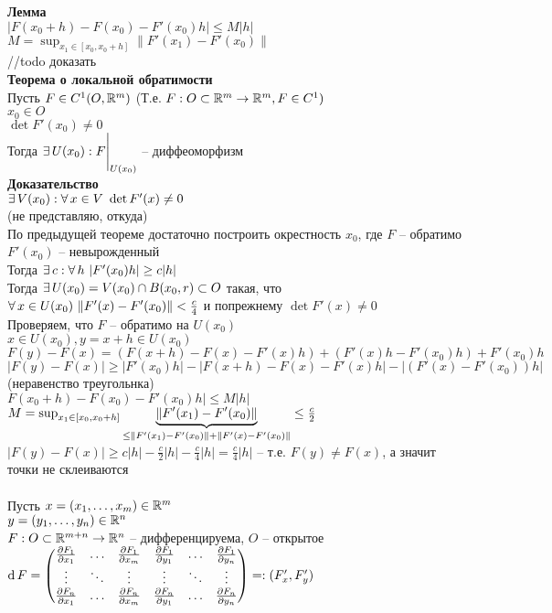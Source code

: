 \documentclass[12pt]{article}
\newcommand{\ppart}[2]{\frac{\partial #1}{\partial #2}}
\begin{document}
\textbf{Лемма}\\
$|F(x_0+h)-F(x_0) - F'(x_0)h| \leq M|h|$\\
$M=\sup_{x_1\in [x_0, x_0+h]} \|F'(x_1)-F'(x_0)\|$\\
//todo доказать\\
\textbf{Теорема о локальной обратимости}\\
Пусть $F \in C^1(O, \Rset^m)$ (Т.е. $F: O\subset \Rset^m \rto \Rset^m, F \in C^1)$\\
$x_0 \in O$\\
$\det F'(x_0) \neq 0$\\
Тогда $\ex U(x_0): F\vl_{U(x_0)}$ -- диффеоморфизм\\
\textbf{Доказательство}\\
$\ex V(x_0): \fall x \in V\ \det F'(x) \neq 0$\\
(не представляю, откуда)\\
По предыдущей теореме достаточно построить окрестность $x_0$, где $F$ -- обратимо\\
$F'(x_0)$ -- невырожденный\\
Тогда $\ex c: \fall h\ |F'(x_0)h| \geq c|h|$\\
Тогда $\ex U(x_0) = V(x_0) \cap B(x_0, r) \subset O$ такая, что $\fall x \in U(x_0)\ \|F'(x)-F'(x_0)\| < \frac c4$ и попрежнему $\det F'(x) \neq 0$\\
Проверяем, что $F$ -- обратимо на $U(x_0)$\\
$x \in U(x_0), y = x+h \in U(x_0)$\\
$F(y)-F(x) = (F(x+h)-F(x)-F'(x)h) + (F'(x)h-F'(x_0)h)+F'(x_0)h$\\
$|F(y)-F(x)|\geq |F'(x_0)h| - |F(x+h)-F(x)-F'(x)h| - |(F'(x)-F'(x_0))h|$ (неравенство треугольнка)\\
$F(x_0+h)-F(x_0) - F'(x_0)h| \leq M|h|$\\
$M=\sup_{x_1\in [x_0, x_0+h]} \ub{\leq \|F'(x_1)-F'(x_0)\| + \|F'(x)-F'(x_0)\|}{\|F'(x_1)-F'(x_0)\|} \leq \frac c2$\\
$|F(y)-F(x)| \geq c|h|-\frac c2|h| - \frac c4|h| = \frac c4|h|$ -- т.е. $F(y)\neq F(x)$, а значит точки не склеиваются\\\\
Пусть $x = (x_1, \ldots, x_m) \in \Rset^m$\\
$y = (y_1, \ldots, y_n) \in \Rset^n$\\
$F:O\subset \Rset^{m+n} \rto \Rset^n$ -- дифференцируема, $O$ -- открытое\\
$\df F = \begin{pmatrix}
    \ppart {F_1}{x_1} & \ldots & \ppart {F_1}{x_m} & \ppart {F_1}{y_1} & \ldots & \ppart {F_1}{y_n}\\
    \vdots & \ddots & \vdots & \vdots & \ddots & \vdots\\
    \ppart {F_n}{x_1} & \ldots & \ppart {F_n}{x_m} & \ppart {F_n}{y_1} & \ldots & \ppart {F_n}{y_n}
\end{pmatrix} =: (F'_x, F'_y)$\\
\end{document}
